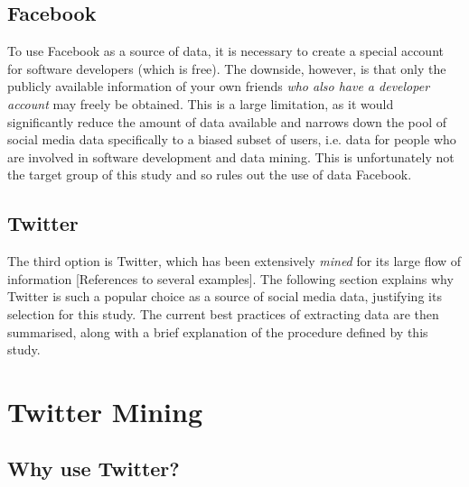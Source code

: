 \documentclass{article}
\begin{document}
\subsection{Facebook}
\label{sec-1-2}
To use Facebook as a source of data, it is necessary to create a special account for software developers (which is free). The downside, however, is that only the publicly available information of your own friends \emph{who also have a developer account} may freely be obtained. This is a large limitation, as it would significantly reduce the amount of data available and narrows down the pool of social media data specifically to a biased subset of users, i.e. data for people who are involved in software development and data mining. This is unfortunately not the target group of this study and so rules out the use of data Facebook.


\subsection{Twitter}
\label{sec-1-3}
The third option is Twitter, which has been extensively \emph{mined} for its large flow of information [References to several examples]. The following section explains why Twitter is such a popular choice as a source of social media data, justifying its selection for this study. The current best practices of extracting data are then summarised, along with a brief explanation of the procedure defined by this study.


\section{Twitter Mining}
\label{sec-2}


\subsection{Why use Twitter?}
\label{sec-2-1}
\end{document}

